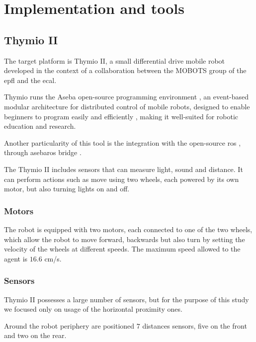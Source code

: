\chapter{Implementation and tools}
\label{chap:impl}

\section{Thymio II}
\label{sec:thymio}

The target platform is Thymio II, a small differential drive mobile robot 
developed 
in the context of a collaboration between the MOBOTS group of the 
\gls{epfl} and 
the \gls{ecal}. 

Thymio runs the Aseba open-source programming environment 
\cite[see][]{magnenat2010aseba}, an event-based modular architecture for 
distributed control of mobile robots, designed to enable beginners to 
program 
easily and efficiently \cite[][]{mondada2017bringing}, making it well-suited 
for 
robotic education and research.

Another particularity of this tool is the integration with the open-source 
\gls{ros} \cite[][]{quigley2009ros}, through asebaros bridge 
\cite[][]{asebaros}. 

The Thymio II includes sensors that can measure light, sound and distance. 
It can 
perform actions such as move using two wheels, each powered by its own 
motor, 
but also turning lights on and off.

\subsection{Motors}
\label{subsection:thymotors}
The robot is equipped with two motors, each connected to one of the two 
wheels, which allow the robot to move forward, backwards but also turn by 
setting the velocity of the wheels at different speeds. The maximum speed 
allowed 
to the agent is $16.6$ \gls{cm/s}.

\subsection{Sensors}
\label{sec:thysensors}

Thymio II possesses a large number of sensors, but for the purpose of this 
study we focused only on usage of the horizontal proximity ones. 

Around the robot periphery are positioned $7$ distances sensors, five on the 
front and two on the rear. 

